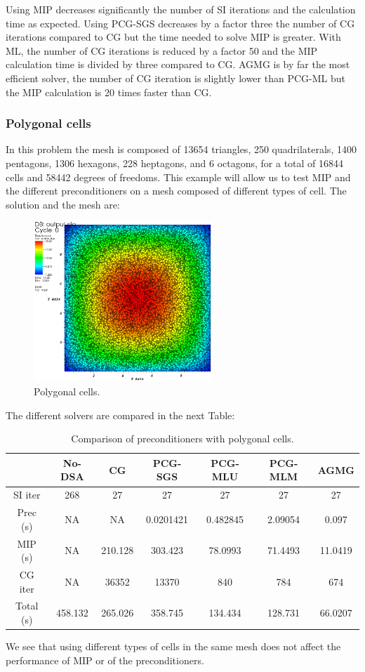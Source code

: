 Using MIP decreases significantly the number of SI iterations and the
calculation time as expected. Using PCG-SGS decreases by a factor three the 
number of CG iterations compared to CG but the time needed to solve MIP is
greater. With ML, the number of CG iterations is reduced by a factor 50 and 
the MIP calculation time is divided by three compared to CG. AGMG is by far 
the most efficient solver, the number of CG iteration is slightly lower 
than PCG-ML but the MIP calculation is 20 times faster than CG.

\subsubsection{Polygonal cells}
In this problem the mesh is composed of 13654 triangles, 250 quadrilaterals,
1400 pentagons, 1306 hexagons, 228 heptagons, and 6 octagons, for a total of
16844 cells and 58442 degrees of freedoms. This example will allow us to test
MIP and the different preconditioners on a mesh composed of different types of
cell. The solution and the mesh are:
\begin{figure}[H]
\centering
\includegraphics[width=0.6\textwidth]{./Dsa/homog_poly_crop}
\caption{Polygonal cells.}
\end{figure}
The different solvers are compared in the next Table:
\begin{table}[H]
\begin{center}
\caption{Comparison of preconditioners with polygonal cells.}
\begin{tabular}{|c|c|c|c|c|c|c|}
\hline
 & No-DSA & CG & PCG-SGS & PCG-MLU & PCG-MLM & AGMG\\
\hline
SI iter & 268 & 27 & 27 & 27 & 27 & 27\\
Prec (s) & NA & NA & 0.0201421 & 0.482845 & 2.09054 & 0.097\\
MIP (s) & NA & 210.128 & 303.423 & 78.0993 & 71.4493 & 11.0419\\
CG iter & NA & 36352 & 13370 & 840 & 784 & 674\\
Total (s) & 458.132 & 265.026 & 358.745 & 134.434 & 128.731 & 66.0207\\
\hline
\end{tabular}
\end{center}
\end{table}
We see that using different types of cells in the same mesh does not affect
the performance of MIP or of the preconditioners. 

